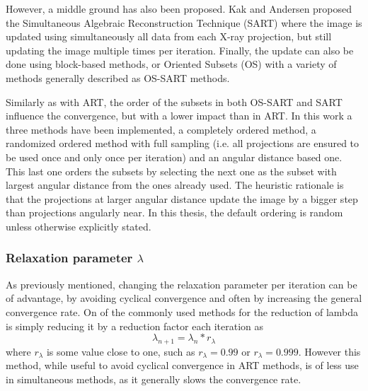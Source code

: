 However, a middle ground has also been proposed. Kak and Andersen proposed\cite{SART} the Simultaneous Algebraic Reconstruction Technique (SART) where the image is updated using simultaneously all data from each X-ray projection, but still updating the image multiple times per iteration. Finally, the update can also be done using block-based methods, or Oriented Subsets (OS) with a variety of methods generally described as OS-SART\cite{OS_SART} methods.

 Similarly as with ART, the order of the subsets in both OS-SART and SART influence the convergence, but with a lower impact than in ART. In this work a three methods have been implemented, a completely ordered method, a randomized ordered method with full sampling (i.e. all projections are ensured to be used once and only once per iteration) and an angular distance based one. This last one orders the subsets by selecting the next one as the subset with largest angular distance from the ones already used. The heuristic rationale is that the projections at larger angular distance update the image by a bigger step than projections angularly near. In this thesis, the default ordering is random unless otherwise explicitly stated.
 



\subsubsection{Relaxation parameter $\lambda$}

As previously mentioned, changing the relaxation parameter per iteration can be of advantage, by avoiding cyclical convergence and often by increasing the general convergence rate. On of the commonly used methods for the reduction of lambda is simply reducing it by a reduction factor each iteration as
\begin{equation}
\lambda_{n+1}=\lambda_n*r_\lambda
\end{equation}
where $r_\lambda$ is some value close to one, such as $r_\lambda=0.99$ or $r_\lambda=0.999$. However this method, while useful to avoid cyclical convergence in ART methods, is of less use in simultaneous methods, as it generally slows the convergence rate.%

